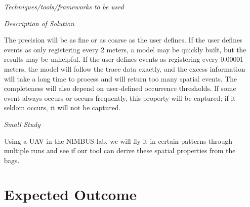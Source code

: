\documentclass{article}
\begin{document}
\emph{Techniques/tools/frameworks to be used}


\emph{Description of Solution}

The precision will be as fine or as coarse as the user defines.
If the user defines events as only registering every 2 meters, a model may be quickly built, but the results may be unhelpful.
If the user defines events as registering every 0.00001 meters, the model will follow the trace data exactly, and the excess information will take a long time to process and will return too many spatial events.
The completeness will also depend on user-defined occurrence thresholds.
If some event always occurs or occurs frequently, this property will be captured; if it seldom occurs, it will not be captured.  

\emph{Small Study}

Using a UAV in the NIMBUS lab, we will fly it in certain patterns through multiple runs and see if our tool can derive these spatial properties from the bags.



\section{Expected Outcome} 




\end{document}

